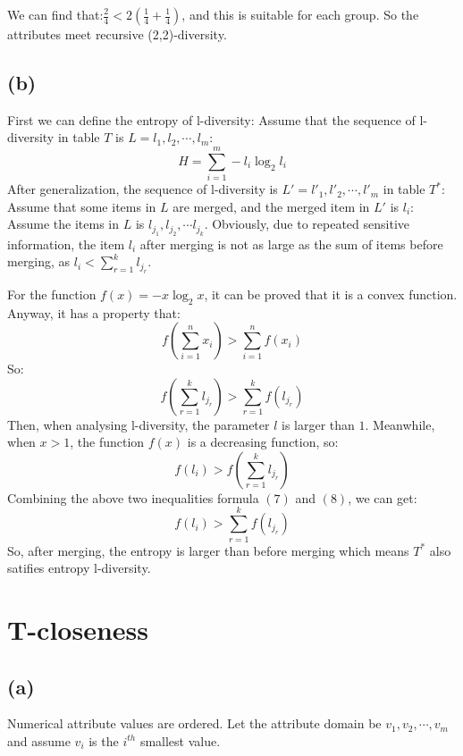 \documentclass[a4paper,12pt]{article}
\begin{document}
We can find that:$\frac{2}{4} < 2(\frac{1}{4}+\frac{1}{4})$, and this is suitable for each group.
So the attributes meet recursive (2,2)-diversity.

\subsection{(b)}
First we can define the entropy of l-diversity:
Assume that the sequence of l-diversity in table $T$ is $L = {l_1, l_2 ,\cdots, l_m}$:
\begin{equation}
    H = \sum\limits_{i=1}^m -l_i\log_2 l_i
\end{equation}
After generalization, the sequence of l-diversity is $L' = {l'_1, l'_2 ,\cdots, l'_m}$ in table $T^*$:
Assume that some items in $L$ are merged, and the merged item in $L'$ is $l_i$:
Assume the items in $L$ is $l_{j_1}, l_{j_2}, \cdots l_{j_k}$.
Obviously, due to repeated sensitive information, the item $l_i$ after merging
is not as large as the sum of items before merging, as $l_i < \sum\limits_{r=1}^{k} l_{j_r}$.

For the function $f(x) = -x\log_2 x$, it can be proved that it is a convex function. Anyway, it has a property that:
\begin{equation}
    f(\sum\limits_{i=1}^{n} x_i) > \sum\limits_{i=1}^{n} f(x_i)
\end{equation}
So:
\begin{equation}
    f(\sum\limits_{r=1}^{k} l_{j_r}) > \sum\limits_{r=1}^{k} f(l_{j_r})
\end{equation}
Then, when analysing l-diversity, the parameter $l$ is larger than $1$.
Meanwhile, when $x > 1$, the function $f(x)$ is a decreasing function, so:
\begin{equation}
    f(l_i) > f(\sum\limits_{r=1}^{k} l_{j_r})
\end{equation}
Combining the above two inequalities formula $(7)$ and $(8)$, we can get:
\begin{equation}
    f(l_i) > \sum\limits_{r=1}^{k} f(l_{j_r})
\end{equation}
So, after merging, the entropy is larger than before merging which means $T^*$ also satifies entropy l-diversity.

\section{T-closeness}
\subsection{(a)}
Numerical attribute values are ordered. Let the attribute
domain be ${v_1, v_2, \cdots, v_m}$ and assume $v_i$ is the $i^{th}$ smallest value.
\end{document}
